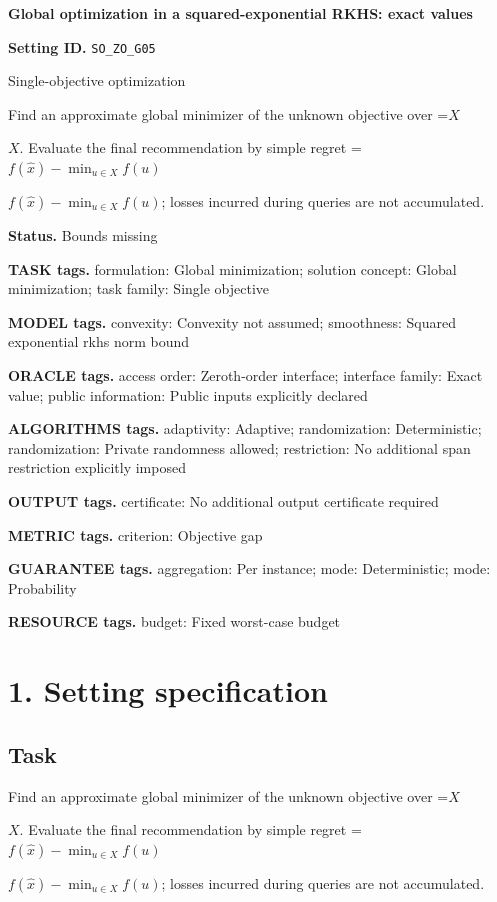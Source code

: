 \documentclass[10pt,a4paper]{article}
\newcommand{\AtlasMath}[1]{\par\begingroup\centering\setbox0=\hbox{$\displaystyle #1$}\ifdim\wd0>1.4\linewidth\typeout{ATLAS WIDE FORMULA: \the\wd0}\fi\ifdim\wd0>\linewidth\resizebox{\linewidth}{!}{\box0}\else\box0\fi\par\endgroup}
\newcommand{\AtlasInlineMath}[1]{\begingroup\setbox0=\hbox{$#1$}\ifdim\wd0>.4\linewidth\endgroup\AtlasMath{#1}\else\endgroup$#1$\fi}
\begin{document}
\raggedright

{\LARGE\bfseries\sffamily\color{AtlasNavy} Global optimization in a squared-exponential RKHS: exact values\par}\vspace{5pt}
\textbf{Setting ID.} \texttt{SO\_\allowbreak{}ZO\_\allowbreak{}G05}

Single-objective optimization

Find an approximate global minimizer of the unknown objective over \AtlasInlineMath{X}. Evaluate the final recommendation by simple regret \AtlasInlineMath{f(\widehat{x})-\min_{u\in X}f(u)}; losses incurred during queries are not accumulated.

\textbf{Status.} Bounds missing

\textbf{TASK tags.} formulation: Global minimization; solution concept: Global minimization; task family: Single objective

\textbf{MODEL tags.} convexity: Convexity not assumed; smoothness: Squared exponential rkhs norm bound

\textbf{ORACLE tags.} access order: Zeroth-order interface; interface family: Exact value; public information: Public inputs explicitly declared

\textbf{ALGORITHMS tags.} adaptivity: Adaptive; randomization: Deterministic; randomization: Private randomness allowed; restriction: No additional span restriction explicitly imposed

\textbf{OUTPUT tags.} certificate: No additional output certificate required

\textbf{METRIC tags.} criterion: Objective gap

\textbf{GUARANTEE tags.} aggregation: Per instance; mode: Deterministic; mode: Probability

\textbf{RESOURCE tags.} budget: Fixed worst-case budget

\section{1. Setting specification}
\subsection{Task}
Find an approximate global minimizer of the unknown objective over \AtlasInlineMath{X}. Evaluate the final recommendation by simple regret \AtlasInlineMath{f(\widehat{x})-\min_{u\in X}f(u)}; losses incurred during queries are not accumulated.
\end{document}
